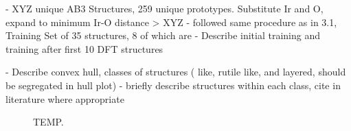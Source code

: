 

- XYZ unique AB3 Structures, 259 unique prototypes.  Substitute Ir and O, expand to minimum Ir-O distance > XYZ
- followed same procedure as in 3.1, Training Set of 35 structures, 8 of which are 
- Describe initial training and training after first 10 DFT structures

- Describe convex hull, classes of structures ( like, rutile like, and layered, should be segregated in hull plot)
- briefly describe structures within each class, cite in literature where appropriate

\begin{figure}
\centering
{}

\caption{\label{fig:convergence_plot_iro3_0}
  TEMP.
  }
\end{figure}

